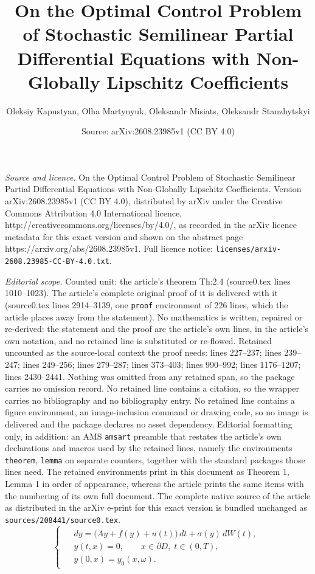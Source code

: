 \documentclass[10pt,a4paper]{amsart}
\title{On the Optimal Control Problem of Stochastic Semilinear Partial Differential Equations with Non-Globally Lipschitz Coefficients}
\author{Oleksiy Kapustyan, Olha Martynyuk, Oleksandr Misiats, Oleksandr Stanzhytskyi}
\date{Source: arXiv:2608.23985v1 (CC BY 4.0)}
\begin{document}
\maketitle

\noindent\emph{Source and licence.} On the Optimal Control Problem of Stochastic Semilinear Partial Differential Equations with Non-Globally Lipschitz Coefficients. Version arXiv:2608.23985v1 (CC BY 4.0), distributed by arXiv under the Creative Commons Attribution 4.0 International licence, http://creativecommons.org/licenses/by/4.0/, as recorded in the arXiv licence metadata for this exact version and shown on the abstract page https://arxiv.org/abs/2608.23985v1. Full licence notice: \texttt{licenses/arxiv-2608.23985-CC-BY-4.0.txt}.\par\smallskip

\noindent\textit{Editorial scope.} Counted unit: the article's theorem Th:2.4 (source0.tex lines 1010--1023). The article's complete original proof of it is delivered with it (source0.tex lines 2914--3139, one \texttt{proof} environment of 226 lines, which the article places away from the statement). No mathematics is written, repaired or re-derived: the statement and the proof are the article's own lines, in the article's own notation, and no retained line is substituted or re-flowed.  Retained uncounted as the source-local context the proof needs: lines 227--237; lines 239--247; lines 249--256; lines 279--287; lines 373--403; lines 990--992; lines 1176--1207; lines 2430--2441.  Nothing was omitted from any retained span, so the package carries no omission record.  No retained line contains a citation, so the wrapper carries no bibliography and no bibliography entry.  No retained line contains a figure environment, an image-inclusion command or drawing code, so no image is delivered and the package declares no asset dependency.  Editorial formatting only, in addition: an AMS \texttt{amsart} preamble that restates the article's own declarations and macros used by the retained lines, namely the environments \texttt{theorem}, \texttt{lemma} on separate counters, together with the standard packages those lines need.  The retained environments print in this document as Theorem 1, Lemma 1 in order of appearance, whereas the article prints the same items with the numbering of its own full document.  The complete native source of the article as distributed in the arXiv e-print for this exact version is bundled unchanged as \texttt{sources/208441/source0.tex}.
\begin{equation}\label{1.1}
\begin{cases}
\begin{aligned}
& dy = \bigl(Ay + f(y) + u(t)\bigr)\,dt
      + \sigma(y)\,dW(t), \\
& y(t,x) = 0,
\qquad x\in \partial D,\; t\in(0,T), \\
& y(0,x) = y_0(x,\omega).
\end{aligned}
\end{cases}
\end{equation}
\end{document}

